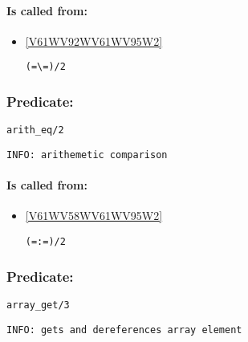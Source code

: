 \paragraph{Is called from:} 
\begin{itemize}
\item \ref{V61WV92WV61WV95W2} 
\begin{verbatim}
(=\=)/2
\end{verbatim}

\end{itemize}

\subsubsection{Predicate:} \label{arithV95WeqV95W2}

\begin{verbatim}
arith_eq/2
\end{verbatim}

{\small \begin{verbatim}
INFO: arithemetic comparison

\end{verbatim}}
\paragraph{Is called from:} 
\begin{itemize}
\item \ref{V61WV58WV61WV95W2} 
\begin{verbatim}
(=:=)/2
\end{verbatim}

\end{itemize}

\subsubsection{Predicate:} \label{arrayV95WgetV95W3}

\begin{verbatim}
array_get/3
\end{verbatim}

{\small \begin{verbatim}
INFO: gets and dereferences array element

\end{verbatim}}
